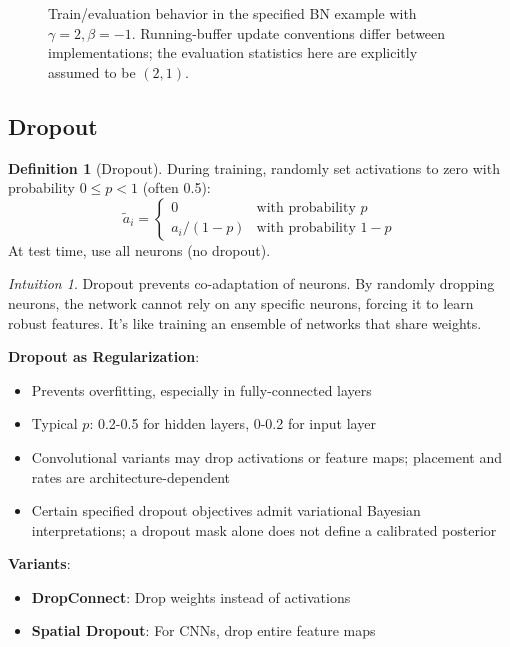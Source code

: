 \documentclass[11pt,twoside]{article}
\numberwithin{equation}{section}
\theoremstyle{plain}
\theoremstyle{definition}
\newtheorem{definition}[theorem]{Definition}
\theoremstyle{remark}
\newtheorem{intuition}[theorem]{Intuition}
\newenvironment{keyidea}{
  \begin{tcolorbox}[colback=yellow!5!white,
                    colframe=yellow!50!black,
                    title=Key Idea,
                    breakable,
                    enhanced,
                    sharp corners,
                    boxrule=0.8pt,
                    left=6pt, right=6pt, top=6pt, bottom=6pt]
}{
  \end{tcolorbox}
}
\begin{document}
\begin{figure}[H]
\centering
{}
\caption{Train/evaluation behavior in the specified BN example with $\gamma=2,\beta=-1$. Running-buffer update conventions differ between implementations; the evaluation statistics here are explicitly assumed to be $(2,1)$.}
\end{figure}

\subsection{Dropout}

\begin{definition}[Dropout]
During training, randomly set activations to zero with probability $0\le p<1$ (often 0.5):
\[
\tilde{a}_i = \begin{cases}
0 & \text{with probability } p \\
a_i / (1-p) & \text{with probability } 1-p
\end{cases}
\]
At test time, use all neurons (no dropout).
\end{definition}

\begin{intuition}
Dropout prevents co-adaptation of neurons. By randomly dropping neurons, the network cannot rely on any specific neurons, forcing it to learn robust features. It's like training an ensemble of networks that share weights.
\end{intuition}

\begin{keyidea}
\textbf{Dropout as Regularization}:
\begin{itemize}
\item Prevents overfitting, especially in fully-connected layers
\item Typical $p$: 0.2-0.5 for hidden layers, 0-0.2 for input layer
\item Convolutional variants may drop activations or feature maps; placement and rates are architecture-dependent
\item Certain specified dropout objectives admit variational Bayesian interpretations; a dropout mask alone does not define a calibrated posterior
\end{itemize}

\textbf{Variants}:
\begin{itemize}
\item \textbf{DropConnect}: Drop weights instead of activations
\item \textbf{Spatial Dropout}: For CNNs, drop entire feature maps
\end{itemize}
\end{keyidea}
\end{document}
